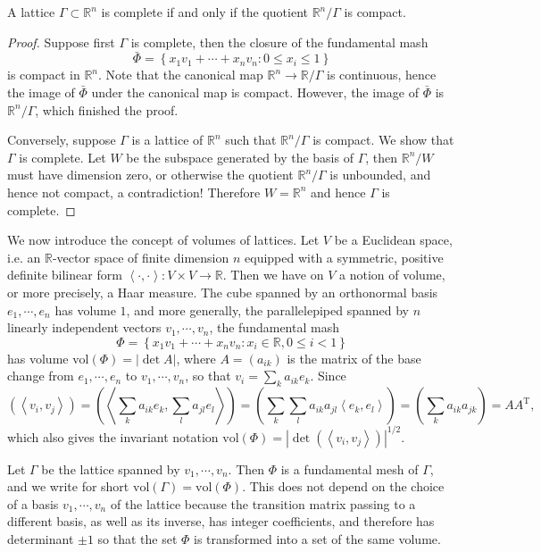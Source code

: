 \begin{corollary}
A lattice $\Gamma\subset\mathbb{R}^n$ is complete if and only if the quotient $\mathbb{R}^n/\Gamma$ is compact.
\end{corollary}
\begin{proof}
Suppose first $\Gamma$ is complete, then the closure of the fundamental mash 
$$
\bar{\Phi}=\left\{ x_1v_1+\cdots +x_nv_n:0\le x_i\le 1 \right\} 
$$
is compact in $\mathbb{R}^n$. Note that the canonical map $\mathbb{R}^n\to\mathbb{R}/\Gamma$ is continuous, hence the image of $\bar{\Phi}$ under the canonical map is compact. However, the image of $\bar{\Phi}$ is $\mathbb{R}^n/\Gamma$, which finished the proof.\par
Conversely, suppose $\Gamma$ is a lattice of $\mathbb{R}^n$ such that $\mathbb{R}^n/\Gamma$ is compact. We show that $\Gamma$ is complete. Let $W$ be the subspace generated by the basis of $\Gamma$, then $\mathbb{R}^n/W$ must have dimension zero, or otherwise the quotient $\mathbb{R}^n/\Gamma$ is unbounded, and hence not compact, a contradiction! Therefore $W=\mathbb{R}^n$ and hence $\Gamma$ is complete. 
\end{proof}
We now introduce the concept of volumes of lattices. Let $V$ be a Euclidean space, i.e. an $\mathbb{R}$-vector space of finite dimension $n$ equipped with a symmetric, positive definite bilinear form $\left<\cdot,\cdot\right>:V\times V\to\mathbb{R}$. Then we have on $V$ a notion of volume, or more precisely, a Haar measure. The cube spanned by an orthonormal basis $e_1,\cdots,e_n$ has volume $1$, and more generally, the parallelepiped spanned by $n$ linearly independent vectors $v_1,\cdots,v_n$, the fundamental mash 
$$
\Phi =\left\{ x_1v_1+\cdots +x_nv_n:x_i\in \mathbb{R} ,0\le i<1 \right\} 
$$
has volume $\mathrm{vol}(\Phi)=|\det A|$, where $A=(a_{ik})$ is the matrix of the base change from $e_1,\cdots,e_n$ to $v_1,\cdots,v_n$, so that $v_i=\sum_ka_{ik}e_k$. Since 
$$
\left( \left< v_i,v_j \right> \right) =\left( \left< \sum_k{a_{ik}e_k},\sum_l{a_{jl}e_l} \right> \right) =\left( \sum_k{\sum_l{a_{ik}a_{jl}\left< e_k,e_l \right>}} \right) =\left( \sum_k{a_{ik}a_{jk}} \right) =AA^{\mathrm{T}},
$$
which also gives the invariant notation $\mathrm{vol}(\Phi)=|\det(\left<v_i,v_j\right>)|^{1/2}$.\par
Let $\Gamma$ be the lattice spanned by $v_1,\cdots,v_n$. Then $\Phi$ is a fundamental mesh of $\Gamma$, and we write for short $\mathrm{vol}(\Gamma)=\mathrm{vol}(\Phi)$. This does not depend on the choice of a basis $v_1,\cdots,v_n$ of the lattice because the transition matrix passing to a different basis, as well as its inverse, has integer coefficients, and therefore has determinant $\pm 1$ so that the set $\Phi$ is transformed into a set of the same volume.\par
